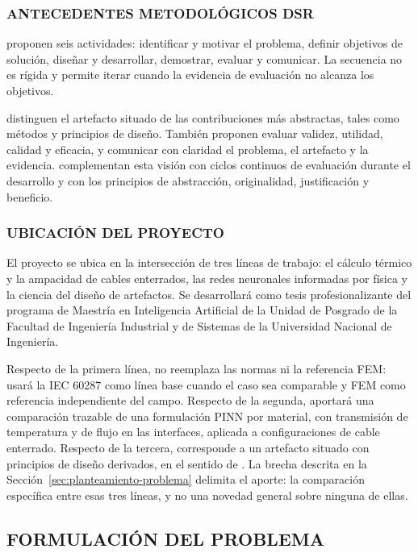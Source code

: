 \subsubsection{ANTECEDENTES METODOLÓGICOS DSR}

\textcite[54--56]{peffers2007} proponen seis actividades: identificar y motivar el problema, definir objetivos de solución, diseñar y desarrollar, demostrar, evaluar y comunicar. La secuencia no es rígida y permite iterar cuando la evidencia de evaluación no alcanza los objetivos.

\textcite[342--350]{gregor2013} distinguen el artefacto situado de las contribuciones más abstractas, tales como métodos y principios de diseño. También proponen evaluar validez, utilidad, calidad y eficacia, y comunicar con claridad el problema, el artefacto y la evidencia. \textcite[198--203]{delport2024} complementan esta visión con ciclos continuos de evaluación durante el desarrollo y con los principios de abstracción, originalidad, justificación y beneficio.

\subsubsection{UBICACIÓN DEL PROYECTO}

El proyecto se ubica en la intersección de tres líneas de trabajo: el cálculo térmico y la ampacidad de cables enterrados, las redes neuronales informadas por física y la ciencia del diseño de artefactos. Se desarrollará como tesis profesionalizante del programa de Maestría en Inteligencia Artificial de la Unidad de Posgrado de la Facultad de Ingeniería Industrial y de Sistemas de la Universidad Nacional de Ingeniería.

Respecto de la primera línea, no reemplaza las normas ni la referencia FEM: usará la IEC 60287 como línea base cuando el caso sea comparable y FEM como referencia independiente del campo. Respecto de la segunda, aportará una comparación trazable de una formulación PINN por material, con transmisión de temperatura y de flujo en las interfaces, aplicada a configuraciones de cable enterrado. Respecto de la tercera, corresponde a un artefacto situado con principios de diseño derivados, en el sentido de \textcite[342--350]{gregor2013}. La brecha descrita en la Sección~\ref{sec:planteamiento-problema} delimita el aporte: la comparación específica entre esas tres líneas, y no una novedad general sobre ninguna de ellas.

\subsection{FORMULACIÓN DEL PROBLEMA}

